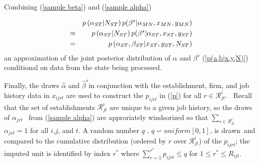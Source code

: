 Combining (\ref{sample beta}) and (\ref{sample alpha})

\begin{eqnarray}
&&p\left( \alpha _{ST}|N_{ST}\right) p(\beta ^{s}|\alpha _{MN},x_{MN},y_{MN})
\label{post mode ST} \\
&\approx &p\left( \alpha _{ST}|N_{ST}\right) p(\beta ^{s}|\alpha
_{ST},x_{ST},y_{ST})  \notag \\
&=&p\left( \alpha _{ST},\beta _{ST}|x_{ST},y_{ST},N_{ST}\right)   \notag
\end{eqnarray}%
an approximation of the joint posterior distribution of $\alpha $ and $\beta
^{s}$ (\ref{p(a,b|x,y,N)}) conditional on data from the state being
processed.

Finally, the draws $\hat{\alpha}$ and $\hat{\beta}^{s}$in conjunction with
the establishment, firm, and job history data in $x_{ijrt}$ are used to
construct the $p_{ijrt}$ in (\ref{p}) for all $r\in \mathcal{R}_{jt}^{i}$. \
Recall that the set of establishments $\mathcal{R}_{jt}^{i}$ are unique to a
given job history, so the draws of $\alpha _{jrt\text{ }}$ from (\ref{sample
alpha}) are approriately windsorized so that $\sum_{s\in \mathcal{R}%
_{jt}^{i}}$ $\alpha _{jst}=1$ for all $i$,$j$, and $t$.  A random number $q$%
, $q\backsim uniform[0,1]$, is drawn\ and compared to the cumulative
distribution (ordered by $r$ over $\mathcal{R}_{jt}^{i}$) of the $p_{ijrt}$;
the imputed unit is identified by index $r^{\ast }$ where $%
\sum\limits_{r=1}^{r^{\ast }}p_{ijrt}\leq q$ for $1\leq r^{\ast }\leq R_{ijt}
$.


